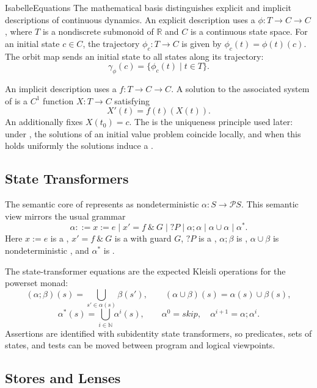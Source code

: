 \documentclass[hidelinks]{article}
\begin{document}
\begin{smodule}[title={IsaVODEs: Interactive Verification of Cyber-Physical Systems at Scale}]{IsabelleEquations}
The mathematical basis distinguishes explicit and implicit descriptions of continuous dynamics.
An explicit description uses a  \(\phi:T\to C\to C\), where \(T\) is a nondiscrete submonoid of \(\mathbb{R}\) and \(C\) is a continuous state space.
For an initial state \(c\in C\), the trajectory \(\phi_c:T\to C\) is given by \(\phi_c(t)=\phi(t)(c)\).
The orbit map sends an initial state to all states along its trajectory:
\[
    \gamma_\phi(c)=\{\phi_c(t)\mid t\in T\}.
\]

An implicit description uses a  \(f:T\to C\to C\).
A solution to the associated system of  is a \(C^1\) function \(X:T\to C\) satisfying
\[
    X'(t)=f(t)(X(t)).
\]
An  additionally fixes \(X(t_0)=c\).
The  is the uniqueness principle used later: under , the solutions of an initial value problem coincide locally, and when this holds uniformly the solutions induce a .

\subsection{State Transformers}

The semantic core of  represents  as nondeterministic  \(\alpha:S\to\mathcal{P}S\).
This semantic view mirrors the usual grammar
\[
    \alpha ::= x := e \mid x' = f\ \&\ G \mid ?P \mid \alpha;\alpha
        \mid \alpha\cup\alpha \mid \alpha^* .
\]
Here \(x := e\) is a , \(x'=f\ \&\ G\) is a  with guard \(G\), \(?P\) is a , \(\alpha;\beta\) is , \(\alpha\cup\beta\) is nondeterministic , and \(\alpha^*\) is .

The state-transformer equations are the expected Kleisli operations for the powerset monad:
\[
    (\alpha;\beta)(s)=\bigcup_{s'\in\alpha(s)}\beta(s'),
    \qquad
    (\alpha\cup\beta)(s)=\alpha(s)\cup\beta(s),
\]
\[
    \alpha^*(s)=\bigcup_{i\in\mathbb{N}}\alpha^i(s),
    \qquad
    \alpha^0=skip,\quad \alpha^{i+1}=\alpha;\alpha^i .
\]
Assertions are identified with subidentity state transformers, so predicates, sets of states, and tests can be moved between program and logical viewpoints.

\subsection{Stores and Lenses}


\end{smodule}
\end{document}
